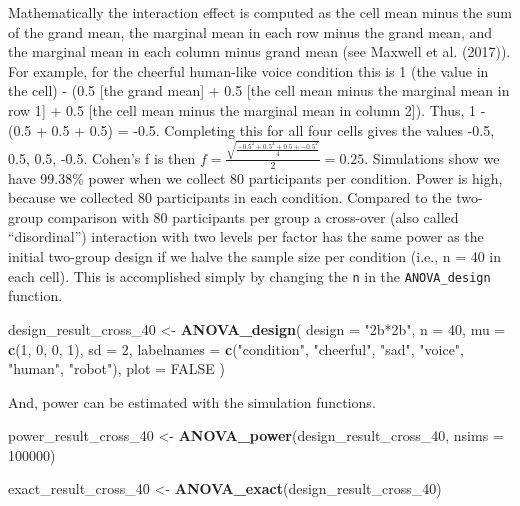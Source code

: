 \documentclass[
  ,man,floatsintext]{apa6}
\newenvironment{Shaded}{\begin{snugshade}}{\end{snugshade}}
\newcommand{\DataTypeTok}[1]{\textcolor[rgb]{0.13,0.29,0.53}{#1}}
\newcommand{\DecValTok}[1]{\textcolor[rgb]{0.00,0.00,0.81}{#1}}
\newcommand{\KeywordTok}[1]{\textcolor[rgb]{0.13,0.29,0.53}{\textbf{#1}}}
\newcommand{\NormalTok}[1]{#1}
\newcommand{\OtherTok}[1]{\textcolor[rgb]{0.56,0.35,0.01}{#1}}
\newcommand{\StringTok}[1]{\textcolor[rgb]{0.31,0.60,0.02}{#1}}
\begin{document}
Mathematically the interaction effect is computed as the cell mean minus the sum of the grand mean, the marginal mean in each row minus the grand mean, and the marginal mean in each column minus grand mean (see Maxwell et al. (2017)). For example, for the cheerful human-like voice condition this is 1 (the value in the cell) - (0.5 {[}the grand mean{]} + 0.5 {[}the cell mean minus the marginal mean in row 1{]} + 0.5 {[}the cell mean minus the marginal mean in column 2{]}).
Thus, 1 - (0.5 + 0.5 + 0.5) = -0.5.
Completing this for all four cells gives the values -0.5, 0.5, 0.5, -0.5.
Cohen's f is then \(f = \frac { \sqrt { \frac { -0.5^2 + 0.5^2 + 0.5 + -0.5^2 } { 4 } }}{ 2 } = 0.25\).
Simulations show we have 99.38\% power when we collect 80 participants per condition.
Power is high, because we collected 80 participants in each condition.
Compared to the two-group comparison with 80 participants per group a cross-over (also called \enquote{disordinal}) interaction with two levels per factor has the same power as the initial two-group design if we halve the sample size per condition (i.e., n = 40 in each cell). This is accomplished simply by changing the \texttt{n} in the \texttt{ANOVA\_design} function.

\begin{Shaded}
\begin{Highlighting}[]
\NormalTok{design_result_cross_}\DecValTok{40}\NormalTok{ <-}\StringTok{ }\KeywordTok{ANOVA_design}\NormalTok{(}
  \DataTypeTok{design =} \StringTok{"2b*2b"}\NormalTok{,}
  \DataTypeTok{n =} \DecValTok{40}\NormalTok{,}
  \DataTypeTok{mu =} \KeywordTok{c}\NormalTok{(}\DecValTok{1}\NormalTok{, }\DecValTok{0}\NormalTok{, }\DecValTok{0}\NormalTok{, }\DecValTok{1}\NormalTok{),}
  \DataTypeTok{sd =} \DecValTok{2}\NormalTok{,}
  \DataTypeTok{labelnames =} \KeywordTok{c}\NormalTok{(}\StringTok{"condition"}\NormalTok{, }\StringTok{"cheerful"}\NormalTok{, }\StringTok{"sad"}\NormalTok{, }
                 \StringTok{"voice"}\NormalTok{, }\StringTok{"human"}\NormalTok{, }\StringTok{"robot"}\NormalTok{),}
  \DataTypeTok{plot =} \OtherTok{FALSE}
\NormalTok{)}

\NormalTok{And, power can be estimated with the simulation functions.}
\end{Highlighting}
\end{Shaded}

\begin{Shaded}
\begin{Highlighting}[]
\NormalTok{power_result_cross_}\DecValTok{40}\NormalTok{ <-}\StringTok{ }\KeywordTok{ANOVA_power}\NormalTok{(design_result_cross_}\DecValTok{40}\NormalTok{, }
                                     \DataTypeTok{nsims =} \DecValTok{100000}\NormalTok{)}

\NormalTok{exact_result_cross_}\DecValTok{40}\NormalTok{ <-}\StringTok{ }\KeywordTok{ANOVA_exact}\NormalTok{(design_result_cross_}\DecValTok{40}\NormalTok{)}
\end{Highlighting}
\end{Shaded}
\end{document}
